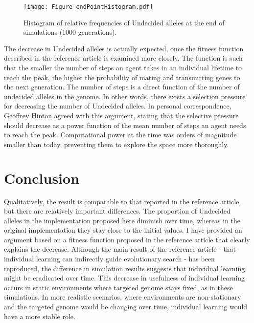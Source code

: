 \documentclass[10pt,a4paper,onecolumn]{article}
\renewcommand{\includegraphics}[2][]{\OldIncludegraphics[width=12cm, #1]{#2}}
\begin{document}
\begin{figure}
\centering
\texttt{[image: Figure\_endPointHistogram.pdf]}
\caption{Histogram of relative frequencies of Undecided alleles at the
end of simulations (1000
generations).}\label{fig:Figure_endPointHistogram}
\end{figure}

The decrease in Undecided alleles is actually expected, once the fitness
function described in the reference article is examined more closely.
The function is such that the smaller the number of steps an agent takes
in an individual lifetime to reach the peak, the higher the probability
of mating and transmitting genes to the next generation. The number of
steps is a direct function of the number of undecided alleles in the
genome. In other words, there exists a selection pressure for decreasing
the number of Undecided alleles. In personal correspondence, Geoffrey
Hinton agreed with this argument, stating that the selective pressure
should decrease as a power function of the mean number of steps an agent
needs to reach the peak. Computational power at the time was orders of
magnitude smaller than today, preventing them to explore the space more
thoroughly.

\section{Conclusion}\label{conclusion}

Qualitatively, the result is comparable to that reported in the
reference article, but there are relatively important differences. The
proportion of Undecided alleles in the implementation proposed here
diminish over time, whereas in the original implementation they stay
close to the initial values. I have provided an argument based on a
fitness function proposed in the reference article that clearly explains
the decrease. Although the main result of the reference article - that
individual learning can indirectly guide evolutionary search - has been
reproduced, the difference in simulation results suggests that
individual learning might be eradicated over time. This decrease in
usefulness of individual learning occurs in static environments where
targeted genome stays fixed, as in these simulations. In more realistic
scenarios, where environments are non-stationary and the targeted genome
would be changing over time, individual learning would have a more
stable role.

{\sffamily \small
  \printbibliography[title=References]
}
\end{document}
